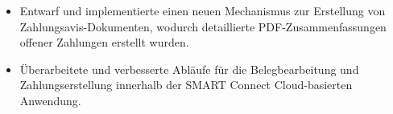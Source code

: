 \begin{minipage}{\linewidth}
\begin{itemize}
  \item Entwarf und implementierte einen neuen Mechanismus zur Erstellung von Zahlungsavis-Dokumenten, wodurch detaillierte PDF-Zusammenfassungen offener Zahlungen erstellt wurden.
  \item Überarbeitete und verbesserte Abläufe für die Belegbearbeitung und Zahlungserstellung innerhalb der SMART Connect Cloud-basierten Anwendung.
\end{itemize}
\end{minipage}
\divider
